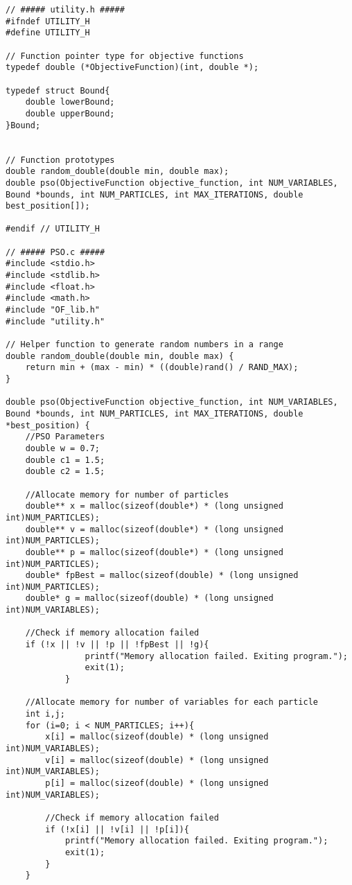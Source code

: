 \documentclass[12pt]{article}
\begin{document}
	\begin{lstlisting}[basicstyle=\small]
		// ##### utility.h #####
#ifndef UTILITY_H
#define UTILITY_H

// Function pointer type for objective functions
typedef double (*ObjectiveFunction)(int, double *);

typedef struct Bound{
    double lowerBound;
    double upperBound;
}Bound;


// Function prototypes
double random_double(double min, double max);
double pso(ObjectiveFunction objective_function, int NUM_VARIABLES, Bound *bounds, int NUM_PARTICLES, int MAX_ITERATIONS, double best_position[]);

#endif // UTILITY_H

// ##### PSO.c #####
#include <stdio.h>
#include <stdlib.h>
#include <float.h>
#include <math.h>
#include "OF_lib.h"
#include "utility.h"

// Helper function to generate random numbers in a range
double random_double(double min, double max) {
    return min + (max - min) * ((double)rand() / RAND_MAX);
}

double pso(ObjectiveFunction objective_function, int NUM_VARIABLES, Bound *bounds, int NUM_PARTICLES, int MAX_ITERATIONS, double *best_position) {
    //PSO Parameters
    double w = 0.7;
    double c1 = 1.5;
    double c2 = 1.5;

    //Allocate memory for number of particles
    double** x = malloc(sizeof(double*) * (long unsigned int)NUM_PARTICLES);
    double** v = malloc(sizeof(double*) * (long unsigned int)NUM_PARTICLES);    
    double** p = malloc(sizeof(double*) * (long unsigned int)NUM_PARTICLES);
    double* fpBest = malloc(sizeof(double) * (long unsigned int)NUM_PARTICLES);
    double* g = malloc(sizeof(double) * (long unsigned int)NUM_VARIABLES);

    //Check if memory allocation failed
    if (!x || !v || !p || !fpBest || !g){
                printf("Memory allocation failed. Exiting program.");
                exit(1);
            }
    
    //Allocate memory for number of variables for each particle
    int i,j;
    for (i=0; i < NUM_PARTICLES; i++){
        x[i] = malloc(sizeof(double) * (long unsigned int)NUM_VARIABLES);        
        v[i] = malloc(sizeof(double) * (long unsigned int)NUM_VARIABLES);
        p[i] = malloc(sizeof(double) * (long unsigned int)NUM_VARIABLES);

        //Check if memory allocation failed
        if (!x[i] || !v[i] || !p[i]){
            printf("Memory allocation failed. Exiting program.");
            exit(1);
        }
    }


\end{lstlisting}
\end{document}
